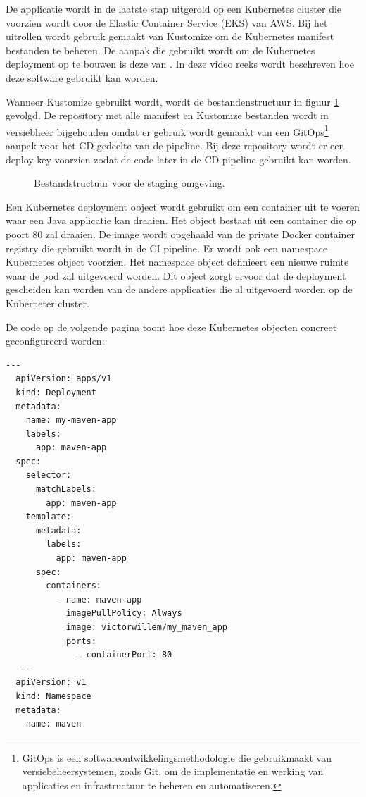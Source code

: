 De applicatie wordt in de laatste stap uitgerold op een Kubernetes cluster die voorzien wordt door de Elastic Container Service (EKS) van AWS. Bij het uitrollen wordt gebruik gemaakt van Kustomize om de Kubernetes manifest bestanden te beheren. De aanpak die gebruikt wordt om de Kubernetes deployment op te bouwen is deze van \textcite{Putra2023}. In deze video reeks wordt beschreven hoe deze software gebruikt kan worden.
\newline 

Wanneer Kustomize gebruikt wordt, wordt de bestandenstructuur in figuur \ref{fig:bestandstructuur} gevolgd. De repository met alle manifest en Kustomize bestanden wordt in versiebheer bijgehouden omdat er gebruik wordt gemaakt van een GitOps\footnote{GitOps is een softwareontwikkelingsmethodologie die gebruikmaakt van versiebeheersystemen, zoals Git, om de implementatie en werking van applicaties en infrastructuur te beheren en automatiseren.} aanpak voor het CD gedeelte van de pipeline. Bij deze repository wordt er een deploy-key voorzien zodat de code later in de CD-pipeline gebruikt kan worden.
\newline

\begin{figure}[H]
  \caption{\label{fig:bestandstructuur}Bestandstructuur voor de staging omgeving.}
\end{figure}

Een Kubernetes deployment object wordt gebruikt om een container uit te voeren waar een Java applicatie kan draaien. Het object bestaat uit een container die op poort 80 zal draaien. De image wordt opgehaald van de private Docker container registry die gebruikt wordt in de CI pipeline. Er wordt ook een namespace Kubernetes object voorzien. Het namespace object definieert een nieuwe ruimte waar de pod zal uitgevoerd worden. Dit object zorgt ervoor dat de deployment gescheiden kan worden van de andere applicaties die al uitgevoerd worden op de Kuberneter cluster. 
\newline

De code op de volgende pagina toont hoe deze Kubernetes objecten concreet geconfigureerd worden:
\clearpage

\begin{lstlisting}[style=Kubernetesyaml,language=Kubernetesyaml]
  ---
  apiVersion: apps/v1
  kind: Deployment
  metadata:
    name: my-maven-app
    labels:
      app: maven-app
  spec:
    selector:
      matchLabels:
        app: maven-app
    template:
      metadata:
        labels:
          app: maven-app
      spec:
        containers:
          - name: maven-app
            imagePullPolicy: Always
            image: victorwillem/my_maven_app
            ports:
              - containerPort: 80
  ---
  apiVersion: v1
  kind: Namespace
  metadata:
    name: maven
\end{lstlisting}

